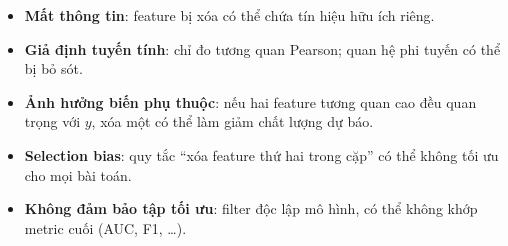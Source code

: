 \begin{luuy}[title={Nhược điểm}]
\begin{itemize}
  \item \textbf{Mất thông tin}: feature bị xóa có thể chứa tín hiệu hữu ích riêng.
  \item \textbf{Giả định tuyến tính}: chỉ đo tương quan Pearson; quan hệ phi tuyến có thể bị bỏ sót.
  \item \textbf{Ảnh hưởng biến phụ thuộc}: nếu hai feature tương quan cao đều quan trọng với $y$, xóa một có thể làm giảm chất lượng dự báo.
  \item \textbf{Selection bias}: quy tắc ``xóa feature thứ hai trong cặp'' có thể không tối ưu cho mọi bài toán.
  \item \textbf{Không đảm bảo tập tối ưu}: filter độc lập mô hình, có thể không khớp metric cuối (AUC, F1, \ldots).
\end{itemize}
\end{luuy}
